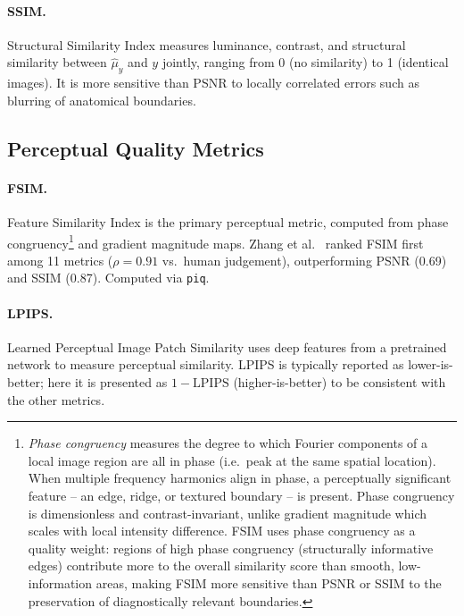 \documentclass[12pt, a4paper, twoside, openright]{book}
\begin{document}
\paragraph{SSIM.}
Structural Similarity Index \cite{wang_image_2004} measures luminance, contrast, and
structural similarity between $\hat{\mu}_y$ and $y$ jointly, ranging from 0 (no similarity)
to 1 (identical images). It is more sensitive than PSNR to locally correlated errors such as
blurring of anatomical boundaries.

\subsection{Perceptual Quality Metrics}
\label{sec:methods:evaluation:perceptual}

\paragraph{FSIM.}
Feature Similarity Index \cite{zhang_fsim_2011} is the primary perceptual metric, computed from phase congruency\footnote{\emph{Phase congruency} \cite{morrone_feature_1987} measures the degree to which Fourier components of a local image region are all in phase (i.e.\ peak at the same spatial location). When multiple frequency harmonics align in phase, a perceptually significant feature -- an edge, ridge, or textured boundary -- is present. Phase congruency is dimensionless and contrast-invariant, unlike gradient magnitude which scales with local intensity difference. FSIM \cite{zhang_fsim_2011} uses phase congruency as a quality weight: regions of high phase congruency (structurally informative edges) contribute more to the overall similarity score than smooth, low-information areas, making FSIM more sensitive than PSNR or SSIM to the preservation of diagnostically relevant boundaries.} and gradient magnitude maps. Zhang et al.\ \cite{zhang_comprehensive_2012} ranked FSIM first among 11 metrics ($\rho=0.91$ vs.\ human judgement), outperforming PSNR (0.69) and SSIM (0.87). Computed via \texttt{piq}.

\paragraph{LPIPS.}
Learned Perceptual Image Patch Similarity \cite{zhang_unreasonable_2018} uses deep
features from a pretrained network to measure perceptual similarity. LPIPS is typically
reported as lower-is-better; here it is presented as $1 - \mathrm{LPIPS}$ (higher-is-better)
to be consistent with the other metrics.
\end{document}
